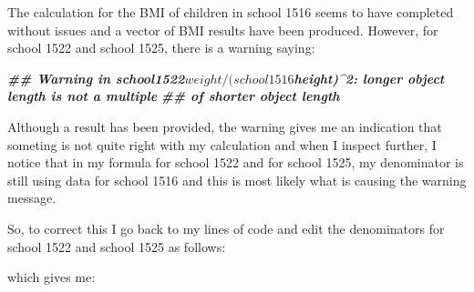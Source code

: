 \documentclass[
  12pt,
]{book}
\newenvironment{Shaded}{\begin{snugshade}}{\end{snugshade}}
\newcommand{\DecValTok}[1]{\textcolor[rgb]{0.00,0.00,0.81}{#1}}
\newcommand{\DocumentationTok}[1]{\textcolor[rgb]{0.56,0.35,0.01}{\textbf{\textit{#1}}}}
\newcommand{\NormalTok}[1]{#1}
\newcommand{\SpecialCharTok}[1]{\textcolor[rgb]{0.00,0.00,0.00}{#1}}
\begin{document}
The calculation for the BMI of children in school 1516 seems to have completed without issues and a vector of BMI results have been produced. However, for school 1522 and school 1525, there is a warning saying:

\begin{Shaded}
\begin{Highlighting}[]
\DocumentationTok{\#\# Warning in school1522$weight/(school1516$height)\^{}2: longer object length is not a multiple}
\DocumentationTok{\#\# of shorter object length}
\end{Highlighting}
\end{Shaded}

Although a result has been provided, the warning gives me an indication that someting is not quite right with my calculation and when I inspect further, I notice that in my formula for school 1522 and for school 1525, my denominator is still using data for school 1516 and this is most likely what is causing the warning message.

So, to correct this I go back to my lines of code and edit the denominators for school 1522 and school 1525 as follows:

\begin{Shaded}
\end{Shaded}

which gives me:

\begin{Shaded}
\end{Shaded}
\end{document}
